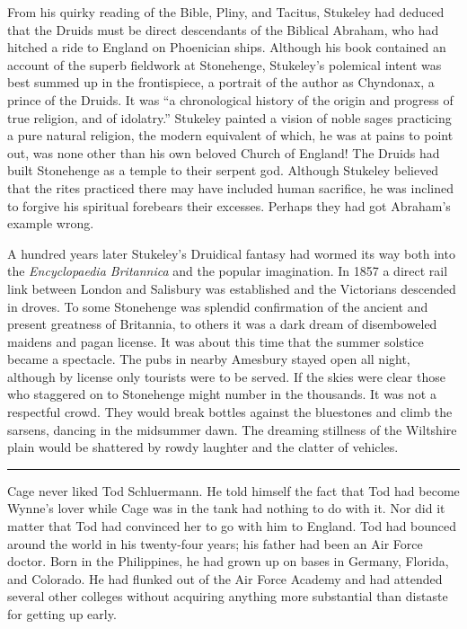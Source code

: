 From his quirky reading of the Bible, Pliny, and Tacitus, Stukeley had deduced that the Druids must be direct descendants of the Biblical Abraham, who had hitched a ride to England on Phoenician ships. Although his book contained an account of the superb fieldwork at Stonehenge, Stukeley's polemical intent was best summed up in the frontispiece, a portrait of the author as Chyndonax, a prince of the Druids. It was ``a chronological history of the origin and progress of true religion, and of idolatry.'' Stukeley painted a vision of noble sages practicing a pure natural religion, the modern equivalent of which, he was at pains to point out, was none other than his own beloved Church of England! The Druids had built Stonehenge as a temple to their serpent god. Although Stukeley believed that the rites practiced there may have included human sacrifice, he was inclined to forgive his spiritual forebears their excesses. Perhaps they had got Abraham's example wrong.

A hundred years later Stukeley's Druidical fantasy had wormed its way both into the \textit{Encyclopaedia Britannica} and the popular imagination. In 1857 a direct rail link between London and Salisbury was established and the Victorians descended in droves. To some Stonehenge was splendid confirmation of the ancient and present greatness of Britannia, to others it was a dark dream of disemboweled maidens and pagan license. It was about this time that the summer solstice became a spectacle. The pubs in nearby Amesbury stayed open all night, although by license only tourists were to be served. If the skies were clear those who staggered on to Stonehenge might number in the thousands. It was not a respectful crowd. They would break bottles against the bluestones and climb the sarsens, dancing in the midsummer dawn. The dreaming stillness of the Wiltshire plain would be shattered by rowdy laughter and the clatter of vehicles.

\fancybreak{* * *}

Cage never liked Tod Schluermann. He told himself the fact that Tod had become Wynne's lover while Cage was in the tank had nothing to do with it. Nor did it matter that Tod had convinced her to go with him to England. Tod had bounced around the world in his twenty-four years; his father had been an Air Force doctor. Born in the Philippines, he had grown up on bases in Germany, Florida, and Colorado. He had flunked out of the Air Force Academy and had attended several other colleges without acquiring anything more substantial than distaste for getting up early.

